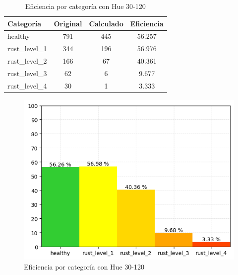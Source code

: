 \captionsetup[figure]{skip=10pt}

\begin{table}[H]
\centering
\begin{tabular}{|l|c|c|c|}
\hline 
\textbf{Categoría} & \textbf{Original} & \textbf{Calculado} & \textbf{Eficiencia} \\
\hline
healthy & 791 & 445 & 56.257 \\
\hline 
rust\_level\_1 & 344 & 196 & 56.976 \\
\hline 
rust\_level\_2 & 166 & 67 & 40.361 \\
\hline 
rust\_level\_3 & 62 & 6 & 9.677 \\
\hline 
rust\_level\_4 & 30 & 1 & 3.333 \\
\hline 
\end{tabular}
\caption{Eficiencia por categoría con Hue 30-120}
\label{table:efficiency_categories_30_120}
\end{table}

\begin{figure}[H]
\centering
\includegraphics[scale=0.6]{images/result_classes_30_120.png}
\caption{Eficiencia por categoría con Hue 30-120}
\label{img:efficiency_categories_30_120}
\end{figure}
